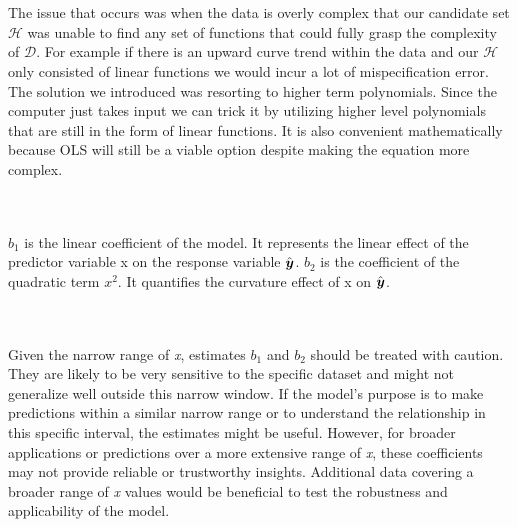 \documentclass[12pt]{article}
\begin{document}
\begin{enumerate}

 \\ \\ 
The issue that occurs was when the data is overly complex that our candidate set $\mathcal{H}$ was unable to find any set of functions that could fully grasp the complexity of $\mathcal{D}$. For example if there is an upward curve trend within the data and our $\mathcal{H}$ only consisted of linear functions we would incur a lot of mispecification error.  The solution we introduced was resorting to higher term polynomials. Since the computer just takes input we can trick it by utilizing higher level polynomials that are still in the form of linear functions. It is also convenient mathematically because OLS will still be a viable option despite making the equation more complex. 

 \\ \\ 
$b_1$ is the linear coefficient of the model. It represents the linear effect of the predictor variable x on the response variable  $\hat{\boldsymbol{y}}$. $b_2$ is the coefficient of the quadratic term $x^{2}$. It quantifies the curvature effect of x on $\hat{\boldsymbol{y}}$.  
 
 \\ \\ 
Given the narrow range of \textit{x}, estimates $b_1$ and $b_2$ should be treated with caution. They are likely to be very sensitive to the specific dataset and might not generalize well outside this narrow window. If the model's purpose is to make predictions within a similar narrow range or to understand the relationship in this specific interval, the estimates might be useful. However, for broader applications or predictions over a more extensive range of \textit{x}, these coefficients may not provide reliable or trustworthy insights. Additional data covering a broader range of \textit{x} values would be beneficial to test the robustness and applicability of the model. 
 

\end{enumerate}
\end{document}
